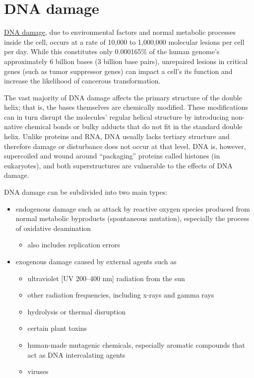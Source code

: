 \hypertarget{dna-damage-1}{%
\section{DNA damage}\label{dna-damage-1}}

\href{https://en.wikipedia.org/wiki/DNA_damage_(naturally_occurring)}{DNA damage}, due to environmental factors and normal metabolic processes inside the cell, occurs at a rate of 10,000 to 1,000,000 molecular lesions per cell per day. While this constitutes only 0.000165\% of the human genome's approximately 6 billion bases (3 billion base pairs), unrepaired lesions in critical genes (such as tumor suppressor genes) can impact a cell's its function and increase the likelihood of cancerous transformation.

The vast majority of DNA damage affects the primary structure of the double helix; that is, the bases themselves are chemically modified. These modifications can in turn disrupt the molecules' regular helical structure by introducing non-native chemical bonds or bulky adducts that do not fit in the standard double helix. Unlike proteins and RNA, DNA usually lacks tertiary structure and therefore damage or disturbance does not occur at that level. DNA is, however, supercoiled and wound around ``packaging'' proteins called histones (in eukaryotes), and both superstructures are vulnerable to the effects of DNA damage.

DNA damage can be subdivided into two main types:

\begin{itemize}
\tightlist
\item
  endogenous damage such as attack by reactive oxygen species produced from normal metabolic byproducts (spontaneous mutation), especially the process of oxidative deamination

  \begin{itemize}
  \tightlist
  \item
    also includes replication errors
  \end{itemize}
\item
  exogenous damage caused by external agents such as

  \begin{itemize}
  \tightlist
  \item
    ultraviolet {[}UV 200--400 nm{]} radiation from the sun
  \item
    other radiation frequencies, including x-rays and gamma rays
  \item
    hydrolysis or thermal disruption
  \item
    certain plant toxins
  \item
    human-made mutagenic chemicals, especially aromatic compounds that act as DNA intercalating agents
  \item
    viruses
  \end{itemize}
\end{itemize}

